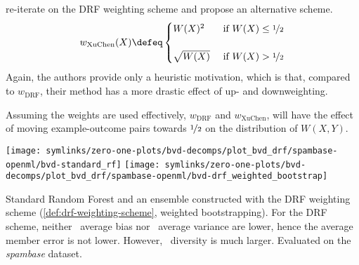 \documentclass[../main.tex]{subfiles}
\begin{document}

\citeauthor{xu_ImplementationPerformanceOptimization_2017} \cite{xu_ImplementationPerformanceOptimization_2017} re-iterate on the DRF weighting scheme and propose an alternative scheme.
$$
w_{\text{XuChen}}(X) \defeq \begin{cases}
W(X)^2 & \text{~if~} W(X) \leq \nicefrac{1}{2} \\ \\
\sqrt{W(X)} & \text{~if~} W(X) > \nicefrac{1}{2}
\end{cases}
$$
Again, the authors provide only a heuristic motivation, which is that, compared to $w_{\text{DRF}}$, their method has a more drastic effect of up- and downweighting. 

Assuming the weights are used effectively, $w_{\text{DRF}}$ and $w_{\text{XuChen}}$, will have the effect of moving example-outcome pairs towards $\nicefrac{1}{2}$ on the distribution of $W(X,Y)$.

\begin{marginfigure}
    \texttt{[image: symlinks/zero-one-plots/bvd-decomps/plot\_bvd\_drf/spambase-openml/bvd-standard\_rf]}
    \texttt{[image: symlinks/zero-one-plots/bvd-decomps/plot\_bvd\_drf/spambase-openml/bvd-drf\_weighted\_bootstrap]}
    \caption{
        Standard Random Forest and an ensemble constructed with the DRF weighting scheme (\cf \ref{def:drf-weighting-scheme}, weighted bootstrapping). For the DRF scheme, neither \avgBiasCircle~average bias nor \avgVarianceCircle~average variance are lower, hence the average member error is not lower. However, \diversityCircle~diversity is much larger. Evaluated on the \textit{spambase} dataset.
    }
    \label{fig:cover-bvd-standard-vs-drf}
\end{marginfigure}
\end{document}
